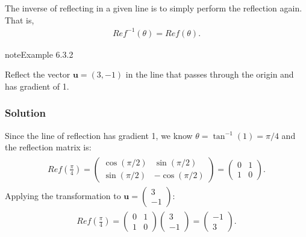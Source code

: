 \documentclass[letterpaper,10pt,english]{jupyterBook}
\begin{document}
\sphinxAtStartPar
The inverse of reflecting in a given line is to simply perform the reflection again. That is,
\begin{equation*}
\begin{split}Re\!f^{-1}(\theta) = Re\!f(\theta).\end{split}
\end{equation*}\label{_pages/6.3_Rotation_reflection_and_translation:reflection-example}
\begin{sphinxadmonition}{note}{Example 6.3.2}



\sphinxAtStartPar
Reflect the vector \(\mathbf{u} = (3, -1)\) in the line that passes through the origin and has gradient of 1.
\subsubsection*{Solution}

\sphinxAtStartPar
Since the line of reflection has gradient 1, we know \(\theta = \tan^{-1}(1) = \pi/4\) and the reflection matrix is:
\begin{equation*}
\begin{split} \begin{align*}
    Re\!f\left( \frac{\pi}{4} \right) = \begin{pmatrix}
        \cos(\pi/2) & \sin(\pi/2) \\
        \sin(\pi/2) & -\cos(\pi/2)
    \end{pmatrix} =
    \begin{pmatrix}
        0 & 1 \\
        1 & 0
    \end{pmatrix}.
\end{align*} \end{split}
\end{equation*}
\sphinxAtStartPar
Applying the transformation to \(\mathbf{u} = \begin{pmatrix} 3 \\ -1 \end{pmatrix}\):
\begin{equation*}
\begin{split} \begin{align*}
    Re\!f\left(\frac{\pi}{4}\right) = \begin{pmatrix} 0 & 1 \\ 1 & 0 \end{pmatrix}
    \begin{pmatrix} 3 \\ -1 \end{pmatrix} =
    \begin{pmatrix} -1 \\ 3 \end{pmatrix}.
\end{align*} \end{split}
\end{equation*}
\begin{figure}[htbp]
\centering
\capstart


\end{figure}
\end{sphinxadmonition}
\end{document}
